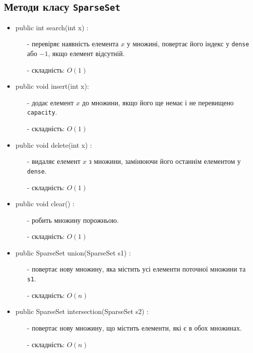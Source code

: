 \documentclass[12pt,a4paper]{article}
\begin{document}
\subsection{Методи класу \texttt{SparseSet}}
\begin{itemize}
    \item public int search(int x) :
    \begin{itemize}
        \item[-]перевіряє наявність елемента $x$ у множині, повертає його індекс у \texttt{dense} або ${-1}$, якщо елемент відсутній.
        \item [-]складність: $O(1)$
    \end{itemize}
    \item  public void insert(int x):
    \begin{itemize}
        \item [-]додає елемент $x$ до множини, якщо його ще немає і не перевищено \texttt{capacity}.
        \item[-] складність: $O(1)$
    \end{itemize}
     \item public void delete(int x) :
    \begin{itemize}
        \item[-] видаляє елемент $x$ з множини, замінюючи його останнім елементом у \texttt{dense}.
        \item[-] складність: $O(1)$
    \end{itemize}
     \item public void clear() :
    \begin{itemize}
        \item[-] робить множину порожньою.
        \item[-] складність: $O(1)$
    \end{itemize}
    
    \item public SparseSet union(SparseSet s1) :
    \begin{itemize}
        \item[-] повертає нову множину, яка містить усі елементи поточної множини та \texttt{s1}.
        \item[-] складність: $O(n)$
    \end{itemize}

    \item public SparseSet intersection(SparseSet s2) :
    \begin{itemize}
        \item[-] повертає нову множину, що містить елементи, які є в обох множинах.
        \item[-] складність: $O(n)$
    \end{itemize}


\end{itemize}
\end{document}
